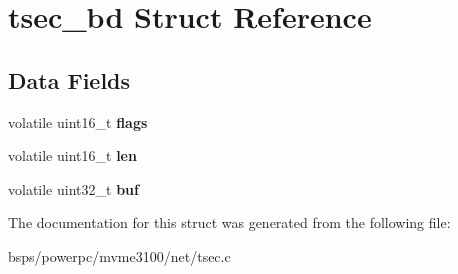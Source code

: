 \hypertarget{structtsec__bd}{}\section{tsec\+\_\+bd Struct Reference}
\label{structtsec__bd}
\subsection*{Data Fields}
\begin{DoxyCompactItemize}
\item 
\mbox{\label{structtsec__bd_a517492c2a00a33eeca3500af9ac02396}} 
volatile uint16\+\_\+t {\bfseries flags}
\item 
\mbox{\label{structtsec__bd_ab7e284ad82ef293268088e7830d649ea}} 
volatile uint16\+\_\+t {\bfseries len}
\item 
\mbox{\label{structtsec__bd_a74e0b50f2377e8ab05d3149e3dced775}} 
volatile uint32\+\_\+t {\bfseries buf}
\end{DoxyCompactItemize}


The documentation for this struct was generated from the following file\+:\begin{DoxyCompactItemize}
\item 
bsps/powerpc/mvme3100/net/tsec.\+c\end{DoxyCompactItemize}
